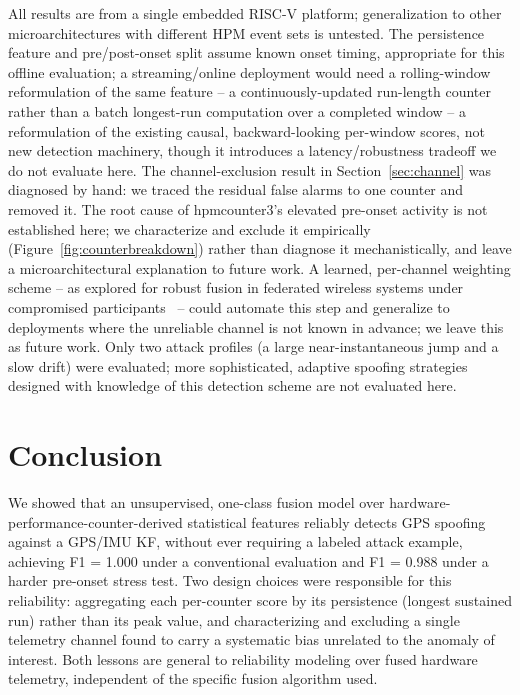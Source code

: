 \documentclass[conference]{IEEEtran}
\begin{document}
All results are from a single embedded RISC-V platform; generalization to other microarchitectures with different HPM event sets is untested. The persistence feature and pre/post-onset split assume known onset timing, appropriate for this offline evaluation; a streaming/online deployment would need a rolling-window reformulation of the same feature -- a continuously-updated run-length counter rather than a batch longest-run computation over a completed window -- a reformulation of the existing causal, backward-looking per-window scores, not new detection machinery, though it introduces a latency/robustness tradeoff we do not evaluate here. The channel-exclusion result in Section~\ref{sec:channel} was diagnosed by hand: we traced the residual false alarms to one counter and removed it. The root cause of hpmcounter3's elevated pre-onset activity is not established here; we characterize and exclude it empirically (Figure~\ref{fig:counterbreakdown}) rather than diagnose it mechanistically, and leave a microarchitectural explanation to future work. A learned, per-channel weighting scheme -- as explored for robust fusion in federated wireless systems under compromised participants~\cite{zhang2024federated} -- could automate this step and generalize to deployments where the unreliable channel is not known in advance; we leave this as future work. Only two attack profiles (a large near-instantaneous jump and a slow drift) were evaluated; more sophisticated, adaptive spoofing strategies designed with knowledge of this detection scheme are not evaluated here.

\section{Conclusion}

We showed that an unsupervised, one-class fusion model over hardware-performance-counter-derived statistical features reliably detects GPS spoofing against a GPS/IMU KF, without ever requiring a labeled attack example, achieving F1 = 1.000 under a conventional evaluation and F1 = 0.988 under a harder pre-onset stress test. Two design choices were responsible for this reliability: aggregating each per-counter score by its persistence (longest sustained run) rather than its peak value, and characterizing and excluding a single telemetry channel found to carry a systematic bias unrelated to the anomaly of interest. Both lessons are general to reliability modeling over fused hardware telemetry, independent of the specific fusion algorithm used.



\end{document}
